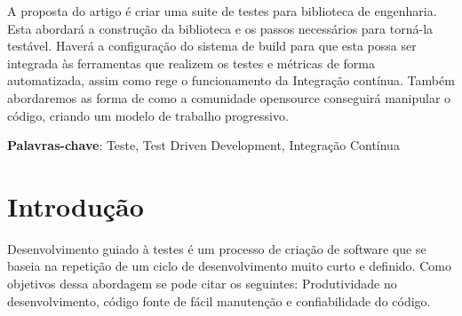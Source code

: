 \documentclass[
	article,			%
	12pt,				%
	oneside,			%
	a4paper,			%
	english,			%
	brazil,				%
	sumario=tradicional
	]{abntex2}
\begin{document}

\frenchspacing 


%
%
\maketitle

\begin{resumoumacoluna}
A proposta do artigo é criar uma suite de testes para biblioteca de engenharia. Esta abordará a construção da biblioteca e os passos necessários para torná-la testável.
Haverá a configuração do sistema de build para que esta possa ser integrada às ferramentas que realizem os testes e métricas de forma automatizada, assim como rege o funcionamento da Integração contínua.
Também abordaremos as forma de como a comunidade opensource conseguirá manipular o código, criando um modelo de trabalho progressivo.

 \vspace{\onelineskip}
 
 \noindent
 \textbf{Palavras-chave}: Teste, Test Driven Development, Integração Contínua
\end{resumoumacoluna}

\textual

\section*{Introdução}

Desenvolvimento guiado à testes é um processo de criação de software
que se baseia na repetição de um ciclo de desenvolvimento muito curto e definido.
Como objetivos dessa abordagem se pode citar os seguintes: Produtividade no desenvolvimento,
código fonte de fácil manutenção e confiabilidade do código.
\end{document}
